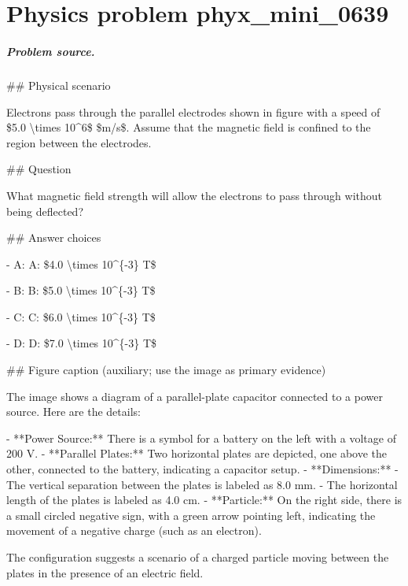 
\chapter{Physics problem phyx\_mini\_0639}
\label{ch:PhyXMiniProblems_problem_phyx_mini_0639}

\paragraph{Problem source.}
\#\# Physical scenario

Electrons pass through the parallel electrodes shown in figure with a speed of \$5.0 \textbackslash{}times 10\textasciicircum{}6\$ \$m/s\$. Assume that the magnetic field is confined to the region between the electrodes.

\#\# Question

What magnetic field strength will allow the electrons to pass through without being deflected?

\#\# Answer choices

- A: A: \$4.0 \textbackslash{}times 10\textasciicircum{}\{-3\} T\$

- B: B: \$5.0 \textbackslash{}times 10\textasciicircum{}\{-3\} T\$

- C: C: \$6.0 \textbackslash{}times 10\textasciicircum{}\{-3\} T\$

- D: D: \$7.0 \textbackslash{}times 10\textasciicircum{}\{-3\} T\$

\#\# Figure caption (auxiliary; use the image as primary evidence)

The image shows a diagram of a parallel-plate capacitor connected to a power source. Here are the details:

- **Power Source:** There is a symbol for a battery on the left with a voltage of 200 V.
- **Parallel Plates:** Two horizontal plates are depicted, one above the other, connected to the battery, indicating a capacitor setup.
- **Dimensions:**
  - The vertical separation between the plates is labeled as 8.0 mm.
  - The horizontal length of the plates is labeled as 4.0 cm.
- **Particle:** On the right side, there is a small circled negative sign, with a green arrow pointing left, indicating the movement of a negative charge (such as an electron).

The configuration suggests a scenario of a charged particle moving between the plates in the presence of an electric field.


